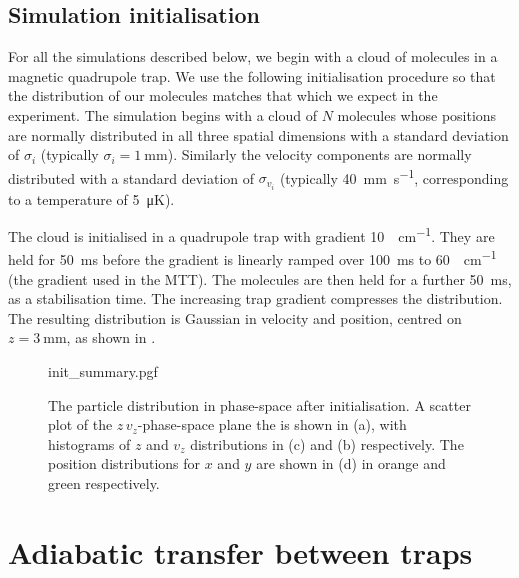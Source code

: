 
\subsection{Simulation initialisation}
\label{design:sim:init}

For all the simulations described below, we begin with a cloud of molecules in
a magnetic quadrupole trap. We use the following initialisation procedure so
that the distribution of our molecules matches that which we expect in the
experiment. 
%
The simulation begins with a cloud of $N$ molecules whose positions are normally distributed
in all three spatial dimensions with a standard deviation of $\sigma_i$
(typically $\sigma_i = \SI{1}{\milli\meter}$). Similarly the velocity components
are normally distributed with a standard deviation of $\sigma_{v_i}$ (typically
\SI{40}{\milli\meter\per\second}, corresponding to a temperature of
\SI{5}{\micro\kelvin}). 

The cloud is initialised in a quadrupole trap with gradient
\SI{10}{\gauss\per\centi\meter}. They are held for \SI{50}{\milli\second}
before the gradient is linearly ramped over \SI{100}{\milli\second} to
\SI{60}{\gauss\per\centi\meter} (the gradient used in the MTT).  The molecules are
then held for a further \SI{50}{\milli\second}, as a stabilisation time. The
increasing trap gradient compresses the distribution. The resulting
distribution is Gaussian in velocity and position, centred on
$z=\SI{3}{\milli\meter}$, as shown in .

\begin{figure}[htb]
\centering
  {init_summary.pgf}
  \caption{ The particle distribution in phase-space after initialisation. A
  scatter plot of the $z\,v_z$-phase-space plane the is shown in (a), with
  histograms of $z$ and $v_z$ distributions in (c) and (b) respectively. The
  position distributions for $x$ and $y$ are shown in (d) in orange and green
  respectively.}
  \label{design:fig:initsum}
\end{figure}

\section{Adiabatic transfer between traps}
\label{design:adiabatic}

